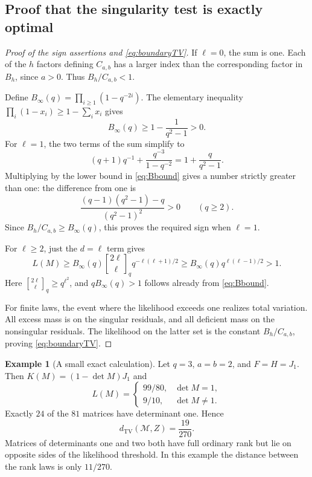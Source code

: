 \documentclass[11pt]{article}
\numberwithin{equation}{section}
\theoremstyle{definition}
\newtheorem{example}[theorem]{Example}
\theoremstyle{remark}
\newcommand{\TV}{d_{\mathrm{TV}}}
\newcommand{\qbin}[2]{\genfrac{[}{]}{0pt}{}{#1}{#2}_{q}}
\newcommand{\Binf}{B_\infty(q)}
\begin{document}
\subsection{Proof that the singularity test is exactly optimal}
\begin{proof}[Proof of the sign assertions and \eqref{eq:boundaryTV}]
If $\ell=0$, the sum is one. Each of the $h$ factors defining $C_{a,b}$ has a larger index than the corresponding factor in $B_h$, since $a>0$. Thus $B_h/C_{a,b}<1$.

Define $\Binf=\prod_{i\ge1}(1-q^{-2i})$. The elementary inequality $\prod_i(1-x_i)\ge1-\sum_ix_i$ gives
\begin{equation}\label{eq:Bbound}
 \Binf\ge1-\frac1{q^2-1}>0.
\end{equation}
For $\ell=1$, the two terms of the sum simplify to
\[
 (q+1)q^{-1}+\frac{q^{-3}}{1-q^{-2}}
 =1+\frac{q}{q^2-1}.
\]
Multiplying by the lower bound in \eqref{eq:Bbound} gives a number strictly greater than one: the difference from one is
\[
 \frac{(q-1)(q^2-1)-q}{(q^2-1)^2}>0\qquad(q\ge2).
\]
Since $B_h/C_{a,b}\ge\Binf$, this proves the required sign when $\ell=1$.

For $\ell\ge2$, just the $d=\ell$ term gives
\[
 L(M)\ge\Binf\qbin{2\ell}\ell q^{-\ell(\ell+1)/2}
 \ge\Binf q^{\ell(\ell-1)/2}>1.
\]
Here $\qbin{2\ell}\ell\ge q^{\ell^2}$, and $q\Binf>1$ follows already from \eqref{eq:Bbound}.

For finite laws, the event where the likelihood exceeds one realizes total variation. All excess mass is on the singular residuals, and all deficient mass on the nonsingular residuals. The likelihood on the latter set is the constant $B_h/C_{a,b}$, proving \eqref{eq:boundaryTV}.
\end{proof}

\begin{example}[A small exact calculation]\label{ex:q3}
Let $q=3$, $a=b=2$, and $F=H=J_1$. Then $K(M)=(1-\det M)J_1$ and
\[
 L(M)=\begin{cases}99/80,&\det M=1,\\9/10,&\det M\ne1.\end{cases}
\]
Exactly $24$ of the $81$ matrices have determinant one. Hence
\[
 \TV(\mathcal M,Z)=\frac{19}{270}.
\]
Matrices of determinants one and two both have full ordinary rank but lie on opposite sides of the likelihood threshold. In this example the distance between the rank laws is only $11/270$.
\end{example}
\end{document}
